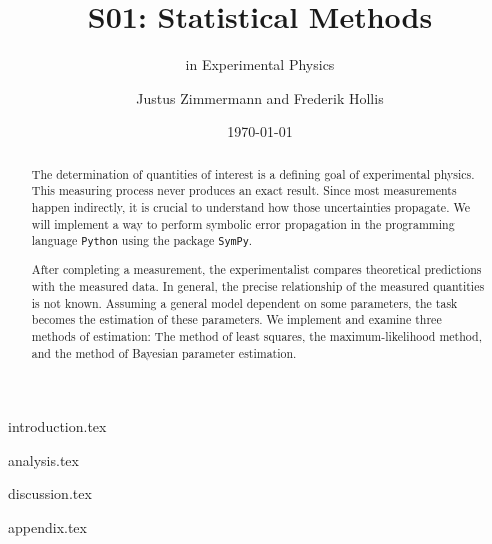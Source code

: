 \documentclass[a4paper, 11pt]{scrartcl}
\title{S01: Statistical Methods}
\subtitle{in Experimental Physics}
\author{Justus Zimmermann and Frederik Hollis}
\date{\today}
\begin{document}
\maketitle

\begin{abstract}
    The determination of quantities of interest is a defining goal of experimental physics.
    This measuring process never produces an exact result.
    Since most measurements happen indirectly, it is crucial to understand how those uncertainties propagate.
    We will implement a way to perform symbolic error propagation in the programming language \verb|Python| using the package \verb|SymPy|.

    After completing a measurement, the experimentalist compares theoretical predictions with the measured data.
    In general, the precise relationship of the measured quantities is not known.
    Assuming a general model dependent on some parameters, the task becomes the estimation of these parameters.
    We implement and examine three methods of estimation: 
    The method of least squares, the maximum-likelihood method, and the method of Bayesian parameter estimation.
\end{abstract}

\tableofcontents

\clearpage
{introduction.tex}

{analysis.tex}

\clearpage
{discussion.tex}

\clearpage
\appendix
{appendix.tex}
\printbibliography
\end{document}
